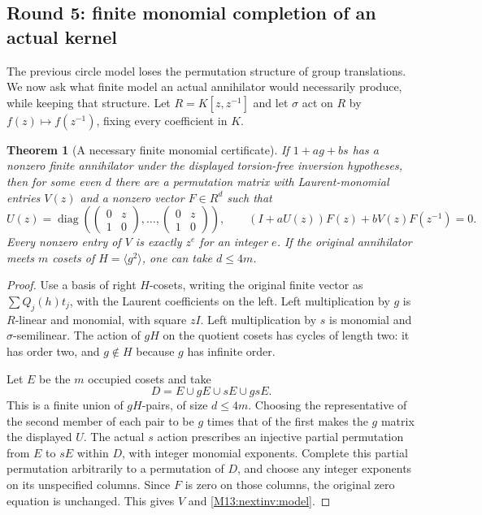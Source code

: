 \documentclass[11pt,a4paper,oneside]{report}
\newtheorem{theorem}{Theorem}[section]
\theoremstyle{definition}
\theoremstyle{remark}
\begin{document}
\subsection{Round 5: finite monomial completion of an actual kernel}

The previous circle model loses the permutation structure of group
translations. We now ask what finite model an actual annihilator
would necessarily produce, while keeping that structure.
Let $R=K[z,z^{-1}]$ and let $\sigma$ act on $R$ by
$f(z)\mapsto f(z^{-1})$, fixing every coefficient in $K$.

\begin{theorem}[A necessary finite monomial certificate]
\label{M13:nextinv:completion}
If $1+ag+bs$ has a nonzero finite annihilator under the displayed
torsion-free inversion hypotheses, then for some even $d$ there
are a permutation matrix with Laurent-monomial entries $V(z)$ and
a nonzero vector $F\in R^d$ such that
\begin{equation}\label{M13:nextinv:model}
 U(z)=\operatorname{diag}\left(
 \begin{pmatrix}0&z\\1&0\end{pmatrix},\ldots,
 \begin{pmatrix}0&z\\1&0\end{pmatrix}\right),
 \qquad (I+aU(z))F(z)+bV(z)F(z^{-1})=0.
\end{equation}
Every nonzero entry of $V$ is exactly $z^e$ for an integer $e$.
If the original annihilator meets $m$ cosets of $H=\langle g^2\rangle$,
one can take $d\le4m$.
\end{theorem}
\begin{proof}
Use a basis of right $H$-cosets, writing the original finite vector
as $\sum Q_j(h)t_j$, with the Laurent coefficients on the left.
Left multiplication by $g$ is $R$-linear and monomial, with square
$zI$. Left multiplication by $s$ is monomial and $\sigma$-semilinear.
The action of $gH$ on the quotient cosets has cycles of length two:
it has order two, and $g\notin H$ because $g$ has infinite order.

Let $E$ be the $m$ occupied cosets and take
\[
 D=E\cup gE\cup sE\cup gsE.
\]
This is a finite union of $gH$-pairs, of size $d\le4m$.
Choosing the representative of the second member of each pair to be
$g$ times that of the first makes the $g$ matrix the displayed $U$.
The actual $s$ action prescribes an injective partial permutation
from $E$ to $sE$ within $D$, with integer monomial exponents.
Complete this partial permutation arbitrarily to a permutation of $D$,
and choose any integer exponents on its unspecified columns.
Since $F$ is zero on those columns, the original zero equation is
unchanged. This gives $V$ and \eqref{M13:nextinv:model}.
\end{proof}
\end{document}
